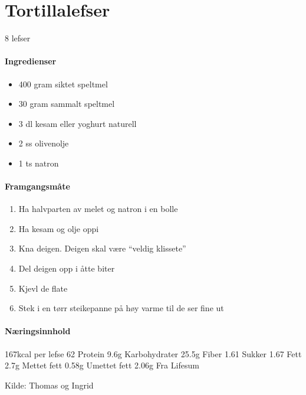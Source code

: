 \section{﻿Tortillalefser}
\label{tortillalefser}
8 lefser

\paragraph{Ingredienser}
\begin{itemize}[noitemsep]
	\item 400 gram siktet speltmel
	\item 30 gram sammalt speltmel
	\item 3 dl kesam eller yoghurt naturell
	\item 2 ss olivenolje
	\item 1 ts natron
\end{itemize}

\paragraph{Framgangsmåte}
\begin{enumerate}[noitemsep]
	\item Ha halvparten av melet og natron i en bolle
	\item Ha kesam og olje oppi
	\item Kna deigen. Deigen skal være “veldig klissete”
	\item Del deigen opp i åtte biter
	\item Kjevl de flate
	\item Stek i en tørr steikepanne på høy varme til de ser fine ut
\end{enumerate}

\paragraph{Næringsinnhold}
167kcal per lefse
62%
Protein 9.6g
Karbohydrater 25.5g
	Fiber 1.61
	Sukker 1.67
Fett 2.7g
	Mettet fett 0.58g
	Umettet fett 2.06g
Fra Lifesum

Kilde: Thomas og Ingrid
